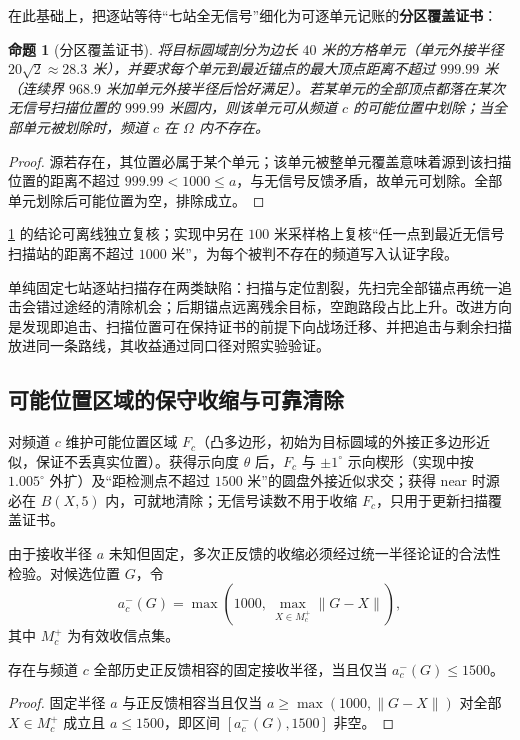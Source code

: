 \documentclass[withoutpreface]{cumcmthesis}
\newtheorem{proposition}{命题}
\begin{document}
在此基础上，把逐站等待“七站全无信号”细化为可逐单元记账的\textbf{分区覆盖证书}：

\begin{proposition}[分区覆盖证书]\label{prop:partition-cert}
将目标圆域剖分为边长 $40$ 米的方格单元（单元外接半径 $20\sqrt2\approx28.3$ 米），并要求每个单元到最近锚点的最大顶点距离不超过 $999.99$ 米（连续界 $968.9$ 米加单元外接半径后恰好满足）。若某单元的全部顶点都落在某次无信号扫描位置的 $999.99$ 米圆内，则该单元可从频道 $c$ 的可能位置中划除；当全部单元被划除时，频道 $c$ 在 $\Omega$ 内不存在。
\end{proposition}
\begin{proof}
源若存在，其位置必属于某个单元；该单元被整单元覆盖意味着源到该扫描位置的距离不超过 $999.99<1000\le a$，与无信号反馈矛盾，故单元可划除。全部单元划除后可能位置为空，排除成立。
\end{proof}

\cref{prop:partition-cert} 的结论可离线独立复核；实现中另在 $100$ 米采样格上复核“任一点到最近无信号扫描站的距离不超过 $1000$ 米”，为每个被判不存在的频道写入认证字段。

单纯固定七站逐站扫描存在两类缺陷：扫描与定位割裂，先扫完全部锚点再统一追击会错过途经的清除机会；后期锚点远离残余目标，空跑路段占比上升。改进方向是发现即追击、扫描位置可在保持证书的前提下向战场迁移、并把追击与剩余扫描放进同一条路线，其收益通过同口径对照实验验证。

\subsection{可能位置区域的保守收缩与可靠清除}

对频道 $c$ 维护可能位置区域 $F_c$（凸多边形，初始为目标圆域的外接正多边形近似，保证不丢真实位置）。获得示向度 $\theta$ 后，$F_c$ 与 $\pm1^\circ$ 示向楔形（实现中按 $1.005^\circ$ 外扩）及“距检测点不超过 $1500$ 米”的圆盘外接近似求交；获得 near 时源必在 $B(X,5)$ 内，可就地清除；无信号读数不用于收缩 $F_c$，只用于更新扫描覆盖证书。

由于接收半径 $a$ 未知但固定，多次正反馈的收缩必须经过统一半径论证的合法性检验。对候选位置 $G$，令
\begin{equation}\label{eq:a_minus}
a_c^-(G)=\max\left(1000,\ \max_{X\in M_c^+}\|G-X\|\right),
\end{equation}
其中 $M_c^+$ 为有效收信点集。

\begin{lemma}[统一半径的收缩合法性]\label{lem:fixed-radius}
存在与频道 $c$ 全部历史正反馈相容的固定接收半径，当且仅当 $a_c^-(G)\le1500$。
\end{lemma}
\begin{proof}
固定半径 $a$ 与正反馈相容当且仅当 $a\ge\max(1000,\|G-X\|)$ 对全部 $X\in M_c^+$ 成立且 $a\le1500$，即区间 $[a_c^-(G),1500]$ 非空。
\end{proof}
\end{document}
